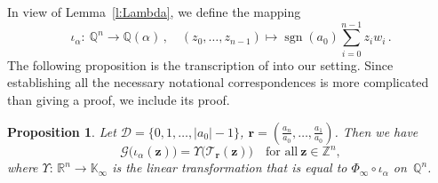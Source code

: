 \documentclass[12pt]{amsart}
\newtheorem{proposition}[lemma]{Proposition}
\theoremstyle{definition}
\theoremstyle{remark}
\numberwithin{equation}{section}
\begin{document}
In view of Lemma~\ref{l:Lambda}, we define the mapping
\[
\iota_\alpha:\ \mathbb{Q}^n \to \mathbb{Q}(\alpha)\,, \quad (z_0, \ldots, z_{n-1}) \mapsto \mathop{\mathrm{sgn}}(a_0) \sum_{i=0}^{n-1} z_i w_i\,.
\]
The following proposition is the transcription of \cite[Theorem~5.12]{BSSST:11} into our setting.
Since establishing all the necessary notational correspondences is more complicated than giving a proof, we include its proof.

\begin{proposition} \label{p:SRS}
Let $\mathcal{D} = \{0, 1, \ldots, |a_0|-1\}$, $\mathbf{r} = (\frac{a_n}{a_0},\ldots,\frac{a_1}{a_0})$.
Then we have
\[
\mathcal{G}\big(\iota_\alpha(\mathbf{z})\big) = \Upsilon\big(\mathcal{T}_\mathbf{r}(\mathbf{z})\big) \quad \mbox{for all}\ \mathbf{z} \in \mathbb{Z}^n,
\]
where $\Upsilon:\, \mathbb{R}^n \to \mathbb{K}_\infty$ is the linear transformation that is equal to $\Phi_\infty \circ \iota_\alpha$ on~$\mathbb{Q}^n$.
\end{proposition}
\end{document}
